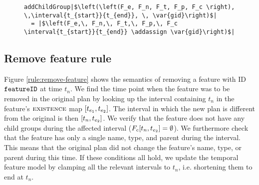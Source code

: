 
\begin{figure}
  \begin{verbatim}
addChildGroup|$\left(\left(F_e, F_n, F_t, F_p, F_c \right), \,\interval{t_{start}}{t_{end}}, \, \var{gid}\right)$|
  = |$\left(F_e,\, F_n,\, F_t,\, F_p,\, F_c \interval{t_{start}}{t_{end}} \addassign \var{gid}\right)$|
  \end{verbatim}
  \caption{\label{fun:add-child-group}}
\end{figure}

\subsection{Remove feature rule}
Figure \vref{rule:remove-feature} shows the semantics of removing a feature with ID $\texttt{featureID}$ at time $t_n$. We find the time point when the feature was to be removed in the original plan by looking up the interval containing $t_n$ in the feature's $\textsc{existence}$ map $\interval{t_{e_1}}{t_{e_2}}$. The interval in which the new plan is different from the original is then $\interval{t_n}{t_{e_2}}$. We verify that the feature does not have any child groups during the affected interval ($F_c \interval{t_{n}}{t_{e_2}} = \emptyset$). We furthermore check that the feature has only a single name, type, and parent during the interval. This means that the original plan did not change the feature's name, type, or parent during this time. If these conditions all hold, we update the temporal feature model by clamping all the relevant intervals to $t_n$, i.e. shortening them to end at $t_n$. 
\\

